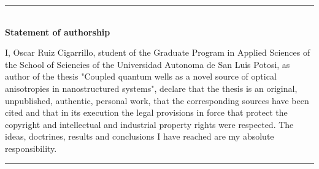 \cleardoublepage
\begin{vcentrepage}

	\noindent\rule[2pt]{\textwidth}{0.8pt}\\
	{\large\textbf{Statement of authorship }}
	\begin{center}
		\justifying
        I, Oscar Ruiz Cigarrillo, student of the Graduate Program in Applied Sciences of the School of Sciencies of the Universidad Autonoma de San Luis Potosi, as author of the thesis "Coupled quantum wells as a novel source of optical anisotropies in nanostructured systems", declare that the thesis is an original, unpublished, authentic, personal work, that the corresponding sources have been cited and that in its execution the legal provisions in force that protect the copyright and intellectual and industrial property rights were respected. The ideas, doctrines, results and conclusions I have reached are my absolute responsibility.
	\end{center}
	\noindent\rule[2pt]{\textwidth}{0.8pt}

\end{vcentrepage}

%